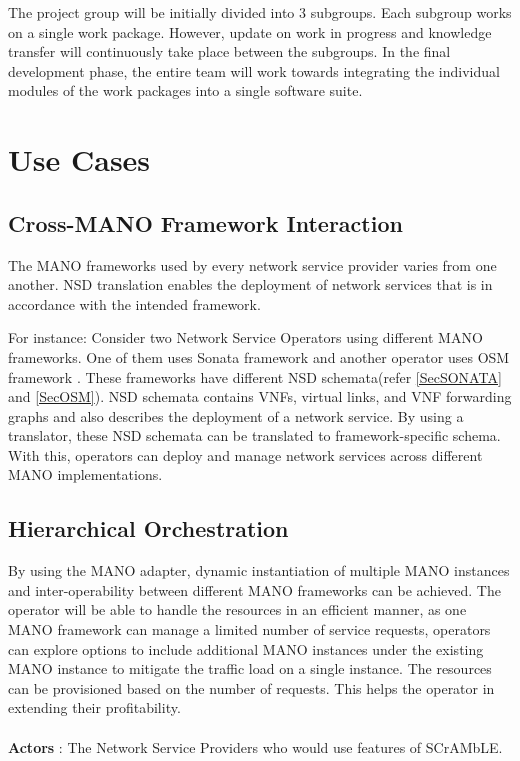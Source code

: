 The project group will be initially divided into 3 subgroups. Each subgroup works on a single work package. However, update on work in progress and knowledge transfer will continuously take place between the subgroups. In the final development phase, the entire team will work towards integrating the individual modules of the work packages into a single software suite.


\section{Use Cases}

\subsection{Cross-MANO Framework Interaction}
The MANO frameworks used by every network service provider varies from one another. NSD translation enables the deployment of network services that is in accordance with the intended framework.

For instance: Consider two Network Service Operators using different MANO frameworks. One of them uses Sonata framework \cite{draxler2017sonata} and another operator uses OSM framework \cite{ersue2013etsi}. These frameworks have different NSD schemata(refer \ref{SecSONATA} and \ref{SecOSM}). NSD schemata contains VNFs, virtual links, and VNF forwarding graphs and also describes the deployment of a network service. By using a translator, these NSD schemata can be translated to framework-specific schema. With this, operators can deploy and manage network services across different MANO implementations.

\subsection{Hierarchical Orchestration}
By using the MANO adapter, dynamic instantiation of multiple MANO instances and inter-operability between different MANO frameworks can be achieved. The operator will be able to handle the resources in an efficient manner, as one MANO framework can manage a limited number of service requests, operators can explore options to include additional MANO instances under the existing MANO instance to mitigate the traffic load on a single instance. The resources can be provisioned based on the number of requests. This helps the operator in extending their profitability.
\\
\\
\textbf{Actors} : The Network Service Providers who would use features of SCrAMbLE.

